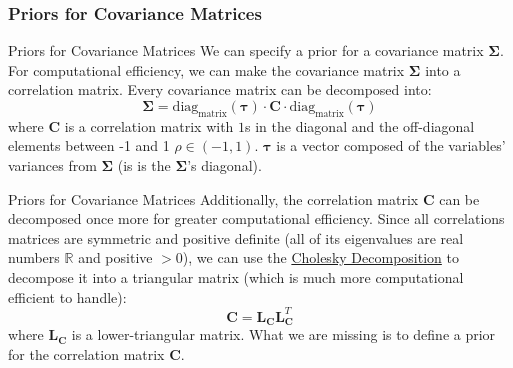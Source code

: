 \subsubsection*{Priors for Covariance Matrices}
\begin{frame}[noframenumbering]{Priors for Covariance Matrices}
	We can specify a prior for a covariance matrix
	$\boldsymbol{\Sigma}$.
	\vfill
	For computational efficiency,
	we can make the covariance matrix $\boldsymbol{\Sigma}$ into a correlation matrix.
	Every covariance matrix can be decomposed into:
	$$
		\boldsymbol{\Sigma}=\text{diag}_\text{matrix}(\boldsymbol{\tau}) \cdot \mathbf{C} \cdot \text{diag}_\text{matrix}(\boldsymbol{\tau})
	$$
	where $\mathbf{C}$ is a correlation matrix with
	$1$s in the diagonal and the off-diagonal elements between -1 and 1 $\rho \in (-1, 1)$.
	$\boldsymbol{\tau}$ is a vector composed of the variables' variances from
	$\boldsymbol{\Sigma}$ (is is the $\boldsymbol{\Sigma}$'s diagonal).
\end{frame}

\begin{frame}[noframenumbering]{Priors for Covariance Matrices}
	\small
	Additionally, the correlation matrix $\mathbf{C}$
	can be decomposed once more for greater computational efficiency.
	Since all correlations matrices are symmetric and positive definite
	(all of its eigenvalues are real numbers $\mathbb{R}$ and positive $>0$),
	we can use the \href{https://en.wikipedia.org/wiki/Cholesky_decomposition}
	{Cholesky Decomposition}
	to decompose it into a triangular matrix
	(which is much more computational efficient to handle):
	$$
		\mathbf{C} = \mathbf{L}_{\mathbf{C}} \mathbf{L}^T_{\mathbf{C}}
	$$
	where $\mathbf{L}_{\mathbf{C}}$ is a lower-triangular matrix.
	\vfill
	What we are missing is to define a prior for the correlation matrix $\mathbf{C}$.
\end{frame}
